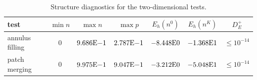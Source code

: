 \begin{table}[t]
\centering
\caption{Structure diagnostics for the two-dimensional tests.}
\label{tab:2d-structure}
\begingroup
\small
\renewcommand{\arraystretch}{1.08}
\setlength{\tabcolsep}{4pt}
\begin{tabular}{lcccccc}
\toprule
test & $\min n$ & $\max n$ & $\max p$ & $E_h(n^0)$ & $E_h(n^K)$ & $D_E^+$ \\
\midrule
annulus filling & $0$ & $9.686{\rm E}{-1}$ & $2.787{\rm E}{-1}$ & $-8.448{\rm E}{0}$ & $-1.368{\rm E}{1}$ & $\le 10^{-14}$ \\
patch merging & $0$ & $9.975{\rm E}{-1}$ & $9.047{\rm E}{-1}$ & $-3.212{\rm E}{0}$ & $-5.048{\rm E}{1}$ & $\le 10^{-14}$ \\
\bottomrule
\end{tabular}
\endgroup
\end{table}
